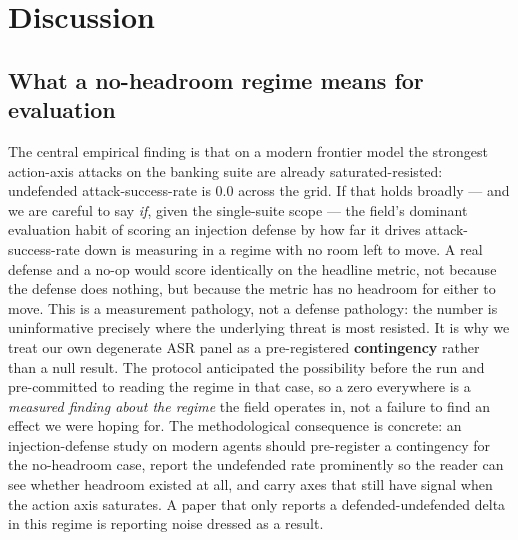 \documentclass[sigconf,anonymous,review]{acmart}
\begin{document}
\section{Discussion}

\subsection{What a no-headroom regime means for evaluation}
The central empirical finding is that on a modern frontier model the strongest action-axis attacks on the banking suite are already saturated-resisted: undefended attack-success-rate is 0.0 across the grid. If that holds broadly --- and we are careful to say \textit{if}, given the single-suite scope --- the field's dominant evaluation habit of scoring an injection defense by how far it drives attack-success-rate down is measuring in a regime with no room left to move. A real defense and a no-op would score identically on the headline metric, not because the defense does nothing, but because the metric has no headroom for either to move. This is a measurement pathology, not a defense pathology: the number is uninformative precisely where the underlying threat is most resisted. It is why we treat our own degenerate ASR panel as a pre-registered \textbf{contingency} rather than a null result. The protocol anticipated the possibility before the run and pre-committed to reading the regime in that case, so a zero everywhere is a \textit{measured finding about the regime} the field operates in, not a failure to find an effect we were hoping for. The methodological consequence is concrete: an injection-defense study on modern agents should pre-register a contingency for the no-headroom case, report the undefended rate prominently so the reader can see whether headroom existed at all, and carry axes that still have signal when the action axis saturates. A paper that only reports a defended-undefended delta in this regime is reporting noise dressed as a result.
\end{document}
